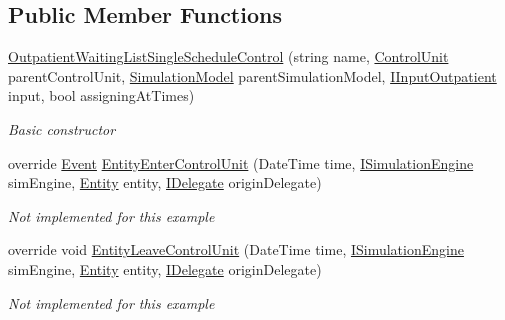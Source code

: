 \subsection*{Public Member Functions}
\begin{DoxyCompactItemize}
\item 
\hyperlink{class_sample_hospital_model_1_1_outpatient_1_1_outpatient_waiting_list_single_schedule_control_ac12ec658002deaf49cc3fffd931983d4}{Outpatient\+Waiting\+List\+Single\+Schedule\+Control} (string name, \hyperlink{class_simulation_core_1_1_h_c_c_m_elements_1_1_control_unit}{Control\+Unit} parent\+Control\+Unit, \hyperlink{class_simulation_core_1_1_simulation_classes_1_1_simulation_model}{Simulation\+Model} parent\+Simulation\+Model, \hyperlink{interface_general_health_care_elements_1_1_department_models_1_1_outpatient_1_1_i_input_outpatient}{I\+Input\+Outpatient} input, bool assigning\+At\+Times)
\begin{DoxyCompactList}\small\item\em Basic constructor \end{DoxyCompactList}\item 
override \hyperlink{class_simulation_core_1_1_h_c_c_m_elements_1_1_event}{Event} \hyperlink{class_sample_hospital_model_1_1_outpatient_1_1_outpatient_waiting_list_single_schedule_control_a88ec38db0d6c4460eb10278bf8741e7a}{Entity\+Enter\+Control\+Unit} (Date\+Time time, \hyperlink{interface_simulation_core_1_1_simulation_classes_1_1_i_simulation_engine}{I\+Simulation\+Engine} sim\+Engine, \hyperlink{class_simulation_core_1_1_h_c_c_m_elements_1_1_entity}{Entity} entity, \hyperlink{interface_simulation_core_1_1_h_c_c_m_elements_1_1_i_delegate}{I\+Delegate} origin\+Delegate)
\begin{DoxyCompactList}\small\item\em Not implemented for this example \end{DoxyCompactList}\item 
override void \hyperlink{class_sample_hospital_model_1_1_outpatient_1_1_outpatient_waiting_list_single_schedule_control_a09ca8ab520d49f51ee9a7bd127958b21}{Entity\+Leave\+Control\+Unit} (Date\+Time time, \hyperlink{interface_simulation_core_1_1_simulation_classes_1_1_i_simulation_engine}{I\+Simulation\+Engine} sim\+Engine, \hyperlink{class_simulation_core_1_1_h_c_c_m_elements_1_1_entity}{Entity} entity, \hyperlink{interface_simulation_core_1_1_h_c_c_m_elements_1_1_i_delegate}{I\+Delegate} origin\+Delegate)
\begin{DoxyCompactList}\small\item\em Not implemented for this example \end{DoxyCompactList}\end{DoxyCompactItemize}
